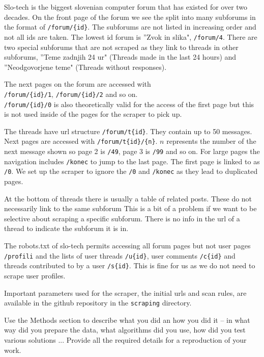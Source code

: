 \documentclass[fleqn,moreauthors,10pt]{ds_report}
\begin{document}
Slo-tech is the biggest slovenian computer forum that has existed for over two decades. On the front page of the forum we see the split into many subforums in the format of \texttt{/forum/\{id\}}. The subforums are not listed in increasing order and not all ids are taken. The lowest id forum is ''Zvok in slika", \texttt{/forum/4}. There are two special subforums that are not scraped as they link to threads in other subforums, ''Teme zadnjih 24 ur" (Threads made in the last 24 hours) and ''Neodgovorjene teme" (Threads without responses).

The next pages on the forum are accessed with \\ \texttt{/forum/\{id\}/1}, \texttt{/forum/\{id\}/2} and so on. \\ \texttt{/forum/\{id\}/0} is also theoretically valid for the access of the first page but this is not used inside of the pages for the scraper to pick up.

The threads have url structure \texttt{/forum/t\{id\}}. They contain up to 50 messages. Next pages are accessed with \texttt{/forum/t\{id\}/\{n\}}. $n$ represents the number of the next message shown so page 2 is \texttt{/49}, page 3 is \texttt{/99} and so on. For large pages the navigation includes \texttt{/konec} to jump to the last page. The first page is linked to as \texttt{/0}. We set up the scraper to ignore the \texttt{/0} and \texttt{/konec} as they lead to duplicated pages.

At the bottom of threads there is usually a table of related posts. These do not necessarily link to the same subforum This is a bit of a problem if we want to be selective about scraping a specific subforum. There is no info in the url of a thread to indicate the subforum it is in.

The robots.txt of slo-tech permits accessing all forum pages but not user pages \texttt{/profili} and the lists of user threads \texttt{/u\{id\}}, user comments \texttt{/c\{id\}} and threads contributed to by a user \texttt{/s\{id\}}. This is fine for us as we do not need to scrape user profiles.

Important parameters used for the scraper, the initial urls and scan rules, are available in the github repository in the \texttt{scraping} directory.

\iffalse
Use the Methods section to describe what you did an how you did it -- in what way did you prepare the data, what algorithms did you use, how did you test various solutions ... Provide all the required details for a reproduction of your work.
\end{document}
